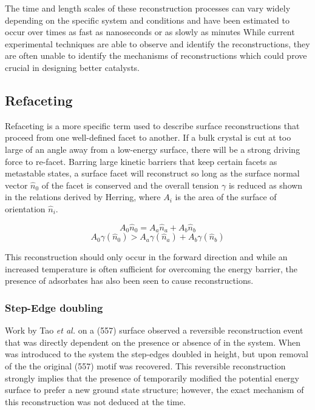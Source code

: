The time and length scales of these reconstruction processes can vary widely
depending on the specific system and conditions and have been estimated to occur
over times as fast as nanoseconds or as slowly as minutes\citep{Tao:2010aa,
Eren:2016qt} While current experimental techniques are able to observe and
identify the reconstructions, they are often unable to identify the 
mechanisms of reconstructions which could prove crucial in designing better
catalysts.

\subsection{Refaceting}
Refaceting is a more specific term used to describe surface reconstructions
that proceed from one well-defined facet to another.  If a bulk crystal is cut
at too large of an angle away from a low-energy surface, there will be a strong
driving force to re-facet. Barring large kinetic barriers that keep certain
facets as metastable states, a surface facet will reconstruct so long as the
surface normal vector $\hat{n}_0$ of the facet is conserved and the overall
tension $\gamma$ is reduced as shown in the relations derived by
Herring\citep{Herring:1951ta}, where $A_i$ is the area of the surface of
orientation $\hat{n}_i$.

\begin{equation}
A_0\hat{n}_0 = A_a\hat{n}_a + A_b\hat{n}_b
\end{equation}
\begin{equation}
A_0\gamma(\hat{n}_0) > A_a\gamma(\hat{n}_a) + A_b\gamma(\hat{n}_b)
\end{equation}

This reconstruction should only occur in the forward direction and while an
increased temperature is often sufficient for overcoming the energy barrier,
the presence of adsorbates has also been seen to cause
reconstructions.\citep{Eren:2016qt, Williams:1994aa, Jeong:1999ev} 

\subsubsection{Step-Edge doubling}
Work by Tao {\it et al.} on a  (557) surface observed a reversible
reconstruction event that was directly dependent on the presence or absence of
 in the system.\citep{Tao:2011aa} When  was introduced to the
system the step-edges doubled in height, but upon removal of the  the original
(557) motif was recovered. This reversible reconstruction strongly implies that
the presence of  temporarily modified the potential energy surface to
prefer a new ground state structure; however, the exact mechanism of this
reconstruction was not deduced at the time. 

